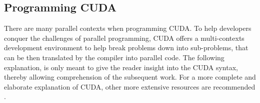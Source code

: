 \subsection{Programming CUDA}

There are many parallel contexts when programming CUDA. To help developers conquer
the challenges of parallel programming, CUDA offers a multi-contexts development
environment to help break problems down into sub-problems, that can be then translated
by the compiler into parallel code. The following explanation, is only meant to
give the reader insight into the CUDA syntax, thereby allowing comprehension of
the subsequent work. For a more complete and elaborate explanation of CUDA, other
more extensive resources are recommended \cite[etc.]{Wilt,Sanders,driver}.

